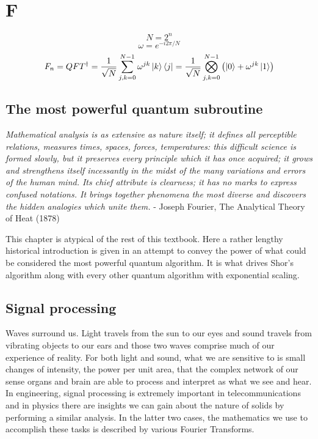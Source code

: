 \documentclass{book}
\begin{document}
\chapter{F}

$$ N = 2^n $$
$$ \omega = e^{-i2\pi /N} $$
$$F_n = QFT^{\dagger} = \frac{1}{\sqrt{N}} \sum_{j,k = 0}^{N-1}\omega^{jk} \ket{k}\bra{j} = \frac{1}{\sqrt{N}}\bigotimes_{j,k = 0}^{N-1}\left(\ket{0} + \omega^{jk}\ket{1} \right)$$

\section{The most powerful quantum subroutine}

\textit{Mathematical analysis is as extensive as nature itself; it defines all perceptible relations, measures times, spaces, forces, temperatures: this difficult science is formed slowly, but it preserves every principle which it has once acquired; it grows and strengthens itself incessantly in the midst of the many variations and errors of the human mind. Its chief attribute is clearness; it has no marks to express confused notations. It brings together phenomena the most diverse and discovers the hidden analogies which unite them.} - Joseph Fourier, The Analytical Theory of Heat (1878) 

This chapter is atypical of the rest of this textbook. Here a rather lengthy historical introduction is given in an attempt to convey the power of what could be considered the most powerful quantum algorithm. It is what drives Shor's algorithm along with every other quantum algorithm with exponential scaling. 

\section{Signal processing}

Waves surround us. Light travels from the sun to our eyes and sound travels from vibrating objects to our ears and those two waves comprise much of our experience of reality. For both light and sound, what we are sensitive to is small changes of intensity, the power per unit area, that the complex network of our sense organs and brain are able to process and interpret as what we see and hear. In engineering, signal processing is extremely important in telecommunications and in physics there are insights we can gain about the nature of solids by performing a similar analysis. In the latter two cases, the mathematics we use to accomplish these tasks is described by various Fourier Transforms. 
\end{document}
